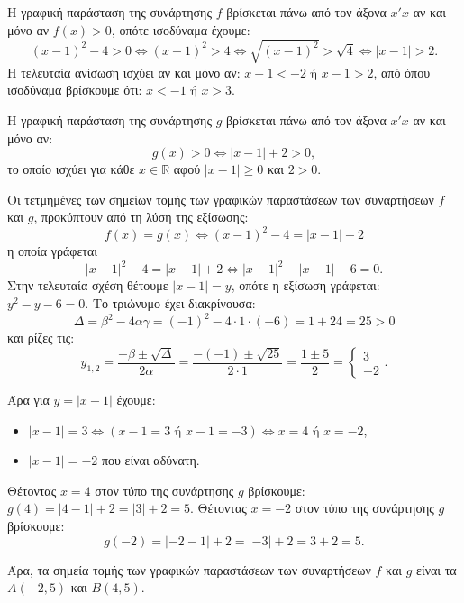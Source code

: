 
\begin{alist}
\item Η γραφική παράσταση της συνάρτησης $f$ βρίσκεται πάνω από τον άξονα $x'x$ αν και μόνο
αν $f(x) > 0$, οπότε ισοδύναμα έχουμε:
\[(x - 1)^2 - 4 > 0 \Leftrightarrow (x - 1)^2 > 4 \Leftrightarrow \sqrt{(x - 1)^2} > \sqrt{4} \Leftrightarrow |x - 1| > 2.\]
Η τελευταία ανίσωση ισχύει αν και μόνο αν:
$x - 1 < -2 \text{ ή } x - 1 > 2$,
από όπου ισοδύναμα βρίσκουμε ότι:
$x < -1 \text{ ή } x > 3$.

\item Η γραφική παράσταση της συνάρτησης $g$ βρίσκεται πάνω από τον άξονα $x'x$ αν και μόνο
αν:
\[g(x) > 0 \Leftrightarrow |x - 1| + 2 > 0,\]
το οποίο ισχύει για κάθε $x \in \mathbb{R}$ αφού $|x - 1| \ge 0$ και $2 > 0$.

\item Οι τετμημένες των σημείων τομής των γραφικών παραστάσεων των συναρτήσεων $f$ και $g$,
προκύπτουν από τη λύση της εξίσωσης:
\[f(x) = g(x) \Leftrightarrow (x - 1)^2 - 4 = |x - 1| + 2\]
η οποία γράφεται
\[|x - 1|^2 - 4 = |x - 1| + 2 \Leftrightarrow |x - 1|^2 - |x - 1| - 6 = 0.\]
Στην τελευταία σχέση θέτουμε $|x - 1| = y$, οπότε η εξίσωση γράφεται:
$y^2 - y - 6 = 0$.
Το τριώνυμο έχει διακρίνουσα:
\[\Delta = \beta^2 - 4\alpha\gamma = (-1)^2 - 4 \cdot 1 \cdot (-6) = 1 + 24 = 25 > 0\]
και ρίζες τις:
\[y_{1,2} = \dfrac{-\beta \pm \sqrt{\Delta}}{2\alpha} = \dfrac{-(-1) \pm \sqrt{25}}{2 \cdot 1} = \dfrac{1 \pm 5}{2} = \begin{cases} 3 \\ -2 \end{cases}.\]

Άρα για $y = |x - 1|$ έχουμε:
\begin{itemize}
\item $|x - 1| = 3 \Leftrightarrow (x - 1 = 3 \text{ ή } x - 1 = -3) \Leftrightarrow x = 4 \text{ ή } x = -2$,
\item $|x - 1| = -2$ που είναι αδύνατη.
\end{itemize}

Θέτοντας $x = 4$ στον τύπο της συνάρτησης $g$ βρίσκουμε:
$g(4) = |4 - 1| + 2 = |3| + 2 = 5$.
Θέτοντας $x = -2$ στον τύπο της συνάρτησης $g$ βρίσκουμε:
\[g(-2) = |-2 - 1| + 2 = |-3| + 2 = 3 + 2 = 5.\]

Άρα, τα σημεία τομής των γραφικών παραστάσεων των συναρτήσεων $f$ και $g$ είναι τα
$A(-2, 5)$ και $B(4, 5)$.
\end{alist}

